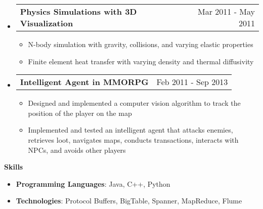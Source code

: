 \documentclass[letterpaper,12pt]{article}
\makeatletter
\newcommand{\resitem}[1]{\item #1 \vspace{-2pt}}
\newcommand{\resheading}[1]{{\large \colorbox{mygrey}{\begin{minipage}{\textwidth}{\textbf{\sc #1 \vphantom{p\^{E}}}}\end{minipage}}}}
\newcommand{\miniheading}[2]{
	\begin{tabular*}{6.5in}{l@{\extracolsep{\fill}}r}
			\textbf{#1} & #2 \\
	\end{tabular*}\vspace{-6pt}
}
\makeatother
\begin{document}
\begin{itemize}
\begin{itemize}
            \end{itemize}
        \item \miniheading{Physics Simulations with 3D Visualization}{Mar 2011 - May 2011}
            \begin{itemize}
                \resitem{N-body simulation with gravity, collisions, and varying elastic properties}
                \resitem{Finite element heat transfer with varying density and thermal diffusivity}
            \end{itemize}
        \item \miniheading{Intelligent Agent in MMORPG}{Feb 2011 - Sep 2013}
            \begin{itemize}
                \resitem{Designed and implemented a computer vision algorithm to track the position of the player on the map}
                \resitem{Implemented and tested an intelligent agent that attacks enemies, retrieves loot, navigates maps, conducts transactions, interacts with NPCs, and avoids other players}
            \end{itemize}
    \end{itemize}

\resheading{Skills}
	\begin{itemize}
		\resitem{\textbf{Programming Languages}: Java, C++, Python}
        \resitem{\textbf{Technologies}: Protocol Buffers, BigTable, Spanner, MapReduce, Flume}
	\end{itemize} %
    
\end{document}
